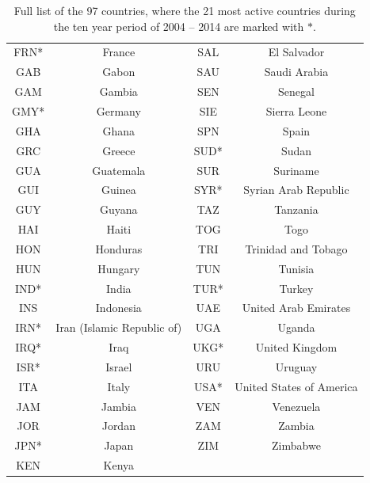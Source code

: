 \documentclass[a4paper]{article}
\begin{document}
\begin{appendices}
\begin{table}[H]
\begin{tabular}{c|c||c|c}
			FRN* & France&SAL & El Salvador\\
			GAB & Gabon 	&SAU & Saudi Arabia\\
			GAM & Gambia	&SEN &Senegal \\
				GMY* & Germany& SIE&Sierra Leone \\
			 	GHA & Ghana	&SPN & Spain\\
			GRC & Greece&SUD* &Sudan \\
				GUA & Guatemala &SUR&Suriname\\
				GUI &Guinea&SYR* & Syrian Arab Republic\\
		GUY & Guyana	&TAZ & Tanzania\\
				HAI & Haiti  &TOG & Togo\\
					HON &Honduras&TRI & Trinidad and Tobago\\
			HUN & Hungary 	&TUN & Tunisia\\
				IND* & India&TUR*& Turkey\\
			INS & Indonesia		&UAE & United Arab Emirates\\
	IRN* & Iran (Islamic Republic of)		& UGA & Uganda\\
			IRQ* & Iraq &UKG* & United Kingdom\\
				ISR* & Israel&URU & Uruguay\\
			ITA & Italy		&USA* & United States of America\\
		JAM& Jambia	&VEN & Venezuela\\
			JOR & Jordan	&ZAM & Zambia\\
			JPN* & Japan	&ZIM & Zimbabwe\\		
				KEN & Kenya&&\\
				\hline
\end{tabular}
	\label{table:importantvotes}
	\caption {Full list of the 97 countries, where the 21 most active countries during the ten year period of 2004 -- 2014 \citep{hoff2015multilinear} are marked with $*$.}
\end{table}


\end{appendices}
\end{document}
